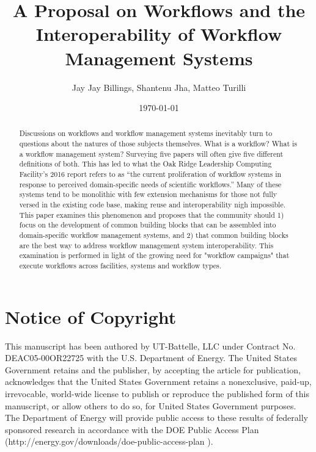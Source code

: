 \documentclass{acmart}
\title{\todo{Need new title!}A Proposal on Workflows and the Interoperability of Workflow Management Systems}
\author{Jay Jay Billings, Shantenu Jha, Matteo Turilli}
\date{\today}
\begin{document}
\begin{abstract}

Discussions on workflows and workflow management systems inevitably turn to questions about the natures of those subjects themselves. What is a workflow? What is a workflow management system? Surveying five papers will often give five different definitions of both. This has led to what the Oak Ridge Leadership Computing Facility’s 2016 report refers to as “the current proliferation of workflow systems in response to perceived domain-specific needs of scientific workflows.” Many of these systems tend to be monolithic with few extension mechanisms for those not fully versed in the existing code base, making reuse and interoperability nigh impossible. This paper examines this phenomenon and proposes that the community should 1) focus on the development of common building blocks that can be assembled into domain-specific workflow management systems, and 2) that common building blocks are the best way to address workflow management system interoperability. This examination is performed in light of the growing need for "workflow campaigns" that execute workflows across facilities, systems and workflow types.



\end{abstract}

\maketitle

\section{Notice of Copyright}\label{notice-of-copyright}

This manuscript has been authored by UT-Battelle, LLC under Contract No.
DEAC05-00OR22725 with the U.S. Department of Energy. The United States
Government retains and the publisher, by accepting the article for
publication, acknowledges that the United States Government retains a
nonexclusive, paid-up, irrevocable, world-wide license to publish or
reproduce the published form of this manuscript, or allow others to do
so, for United States Government purposes. The Department of Energy will
provide public access to these results of federally sponsored research
in accordance with the DOE Public Access Plan
(http://energy.gov/downloads/doe-public-access-plan ).
\end{document}
